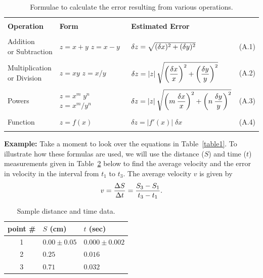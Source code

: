 \begin{table}[ht]
\begin{center}
\caption{Formulae to calculate the error resulting from various operations.
   \label{table1}}
\vspace{12pt}
\begin{tabular}{|llll|}
\hline
 & & &   \\
{\bf Operation} & {\bf Form} & {\bf Estimated Error} & \\
 & & &   \\
\parbox{1.1in}{Addition\\
\hspace*{1ex} or Subtraction} & \parbox{.6in}{$z = x+y$ \\ $z=x-y$} &
   $\delta z = \sqrt{  (\delta x)^{2} \mathstrut+ (\delta y)^{2} } $ & (A.1) \\
 & & & \\
\parbox{1.1in}{Multiplication \\
\hspace*{1ex} or Division}& \parbox{.6in}{$z = xy$ \\ $z=x/y$} &
${\displaystyle\delta z=|z| \: \sqrt{ 
\left( { \delta x  \over x} \right)^2+
\left( { \delta y  \over y} \right)^2}}$
   & (A.2) \\
 & & &   \\
Powers & \parbox{.8in}{
$z = x^{m}\;y^{n}$\\ ${z} = x^{m}/y^{n}$} &
   $ {\displaystyle\delta z = |z| \: \sqrt{ \left (m \: {{\delta x}
\over
{x}}\right)^{2} + \left(n \: {{\delta y} \over {y}}\right)^{2} }}$ & (A.3)
\\ & & & \\
Function & 
$z = f(x)$ &
   $ {\displaystyle\delta z = \left|f'(x)\right|\; \delta x}$ & (A.4)
\\ & & & \\
\hline
\end{tabular}
\label{errorprop}
\end{center}
\end{table}

{\bf Example: }
Take a moment to look over the equations in Table~\ref{table1}.  To
illustrate how these formulas are used, we will use the distance ($S$)
and time ($t$) measurements given in Table~\ref{table2} below to find
the average velocity and the error in velocity in the interval from
$t_1$ to $t_3$.  The average velocity $v$ is given by
\[
v = {\Delta S \over {\Delta t}} = {{S_{3} - S_{1}} \over {t_{3} -
t_{1}}} .
\]

\begin{table}[ht]
\begin{center}
\begin{tabular}{|cll|}
\hline
point \# & $S$ (cm) & $t$ (sec) \\ \hline
1 & $0.00 \pm 0.05$ & $0.000 \pm 0.002$ \\
2 & $0.25$ & $0.016$ \\
3 & $0.71$ & $0.032$
\\ \hline
\end{tabular}
\end{center}
\caption{Sample distance and time data.  \label{table2}}
\end{table}

